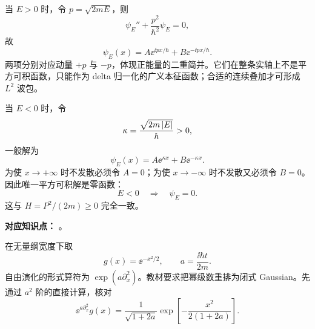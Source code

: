\begin{checkedsolution}
当 $E>0$ 时，令 $p=\sqrt{2mE}$，则
\begin{equation}
  \psi_E''+\frac{p^2}{\hbar^2}\psi_E=0,
  \label{eq:QM-C05-S01-E02-positive-ode}
\end{equation}
故
\begin{equation}
  \boxed{
  \psi_E(x)=A\ee^{\ii px/\hbar}+B\ee^{-\ii px/\hbar}}.
  \label{eq:QM-C05-S01-E02-positive-solution}
\end{equation}
两项分别对应动量 $+p$ 与 $-p$，体现正能量的二重简并。它们在整条实轴上不是平方可积函数，只能作为 delta 归一化的广义本征函数；合适的连续叠加才可形成 $L^2$ 波包。

当 $E<0$ 时，令
\begin{equation}
  \kappa=\frac{\sqrt{2m\left|E\right|}}{\hbar}>0,
  \label{eq:QM-C05-S01-E02-kappa}
\end{equation}
一般解为
\begin{equation}
  \psi_E(x)=A\ee^{\kappa x}+B\ee^{-\kappa x}.
  \label{eq:QM-C05-S01-E02-negative-solution}
\end{equation}
为使 $x\to+\infty$ 时不发散必须令 $A=0$；为使 $x\to-\infty$ 时不发散又必须令 $B=0$。因此唯一平方可积解是零函数：
\begin{equation}
  \boxed{E<0\quad\Longrightarrow\quad\psi_E=0}.
  \label{eq:QM-C05-S01-E02-no-negative-state}
\end{equation}
这与 $H=P^2/(2m)\geq0$ 完全一致。
\end{checkedsolution}


\textbf{对应知识点：}
。

在无量纲宽度下取
\begin{equation}
  g(x)=\ee^{-x^2/2},
  \qquad
  a=\frac{\ii\hbar t}{2m}.
  \label{eq:QM-C05-S01-E03-definitions}
\end{equation}
自由演化的形式算符为 $\exp(a\partial_x^2)$。教材要求把幂级数重排为闭式 Gaussian。先通过 $a^2$ 阶的直接计算，核对
\begin{equation}
  \ee^{a\partial_x^2}g(x)
  =\frac{1}{\sqrt{1+2a}}
  \exp\left[-\frac{x^2}{2(1+2a)}\right].
  \label{eq:QM-C05-S01-E03-target}
\end{equation}

